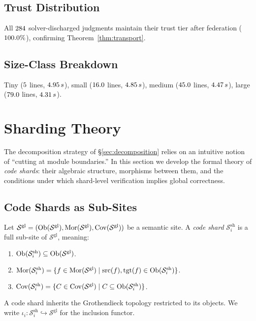 \documentclass[11pt]{article}
\newcommand{\ShardSite}{\mathcal{S}^{\mathrm{sh}}}
\newcommand{\GlobalSite}{\mathcal{S}^{\mathrm{gl}}}
\begin{document}
\subsection{Trust Distribution}
All $284$ solver-discharged judgments maintain
their trust tier after federation ($100.0\%$),
confirming Theorem~\ref{thm:transport}.

\subsection{Size-Class Breakdown}
Tiny ($5$ lines, $4.95\,s$),
small ($16.0$ lines, $4.85\,s$),
medium ($45.0$ lines, $4.47\,s$),
large ($79.0$ lines, $4.31\,s$).

\section{Sharding Theory}\label{sec:sharding}

The decomposition strategy of §\ref{sec:decomposition} relies on an
intuitive notion of ``cutting at module boundaries.''  In this section
we develop the formal theory of \emph{code shards}: their algebraic
structure, morphisms between them, and the conditions under which
shard-level verification implies global correctness.

\subsection{Code Shards as Sub-Sites}

\begin{definition}\label{def:shard}
Let $\GlobalSite = (\Ob(\GlobalSite), \Mor(\GlobalSite),
\Cov(\GlobalSite))$ be a semantic site.  A \emph{code shard}
$\ShardSite_i$ is a full sub-site of $\GlobalSite$, meaning:
\begin{enumerate}[noitemsep]
  \item $\Ob(\ShardSite_i) \subseteq \Ob(\GlobalSite)$.
  \item $\Mor(\ShardSite_i) = \{f \in \Mor(\GlobalSite) \mid
        \mathrm{src}(f), \mathrm{tgt}(f) \in \Ob(\ShardSite_i)\}$.
  \item $\Cov(\ShardSite_i) = \{C \in \Cov(\GlobalSite) \mid
        C \subseteq \Ob(\ShardSite_i)\}$.
\end{enumerate}
A code shard inherits the Grothendieck topology restricted to its
objects.  We write $\iota_i\colon \ShardSite_i \hookrightarrow
\GlobalSite$ for the inclusion functor.
\end{definition}
\end{document}
